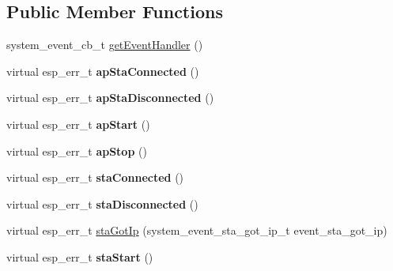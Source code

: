 \subsection*{Public Member Functions}
\begin{DoxyCompactItemize}
\item 
system\+\_\+event\+\_\+cb\+\_\+t \hyperlink{class_wi_fi_event_handler_a9eeffe417501462c8a12a9e879a69444}{get\+Event\+Handler} ()
\item 
virtual esp\+\_\+err\+\_\+t {\bfseries ap\+Sta\+Connected} ()\hypertarget{class_wi_fi_event_handler_a4ee55ebb6efef5eaedf92659de6ba41d}{}\label{class_wi_fi_event_handler_a4ee55ebb6efef5eaedf92659de6ba41d}

\item 
virtual esp\+\_\+err\+\_\+t {\bfseries ap\+Sta\+Disconnected} ()\hypertarget{class_wi_fi_event_handler_a90051d0d6bf11854669b9eb2099c5371}{}\label{class_wi_fi_event_handler_a90051d0d6bf11854669b9eb2099c5371}

\item 
virtual esp\+\_\+err\+\_\+t {\bfseries ap\+Start} ()\hypertarget{class_wi_fi_event_handler_ad7f61897eeb4921461fd12c959b5b979}{}\label{class_wi_fi_event_handler_ad7f61897eeb4921461fd12c959b5b979}

\item 
virtual esp\+\_\+err\+\_\+t {\bfseries ap\+Stop} ()\hypertarget{class_wi_fi_event_handler_ae59d30f07785f4776ba348addde57d9e}{}\label{class_wi_fi_event_handler_ae59d30f07785f4776ba348addde57d9e}

\item 
virtual esp\+\_\+err\+\_\+t {\bfseries sta\+Connected} ()\hypertarget{class_wi_fi_event_handler_af12640a72f3563a1d0ba6abf15fd3621}{}\label{class_wi_fi_event_handler_af12640a72f3563a1d0ba6abf15fd3621}

\item 
virtual esp\+\_\+err\+\_\+t {\bfseries sta\+Disconnected} ()\hypertarget{class_wi_fi_event_handler_ab812cd56db587d6fd346257a1d33d53e}{}\label{class_wi_fi_event_handler_ab812cd56db587d6fd346257a1d33d53e}

\item 
virtual esp\+\_\+err\+\_\+t \hyperlink{class_wi_fi_event_handler_ab01ad1cdc445bb2107125ec89a71886d}{sta\+Got\+Ip} (system\+\_\+event\+\_\+sta\+\_\+got\+\_\+ip\+\_\+t event\+\_\+sta\+\_\+got\+\_\+ip)
\item 
virtual esp\+\_\+err\+\_\+t {\bfseries sta\+Start} ()\hypertarget{class_wi_fi_event_handler_a42497c852ceb28651432e887a7c5405d}{}\label{class_wi_fi_event_handler_a42497c852ceb28651432e887a7c5405d}


\end{DoxyCompactItemize}
